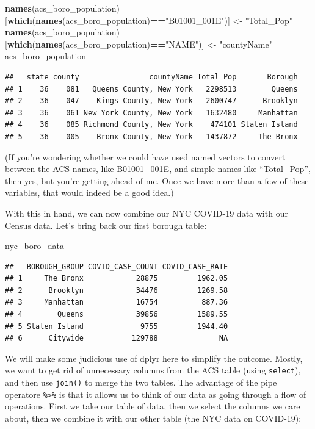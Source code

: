 \documentclass[openany]{book}
\newenvironment{Shaded}{\begin{snugshade}}{\end{snugshade}}
\newcommand{\KeywordTok}[1]{\textcolor[rgb]{0.13,0.29,0.53}{\textbf{#1}}}
\newcommand{\NormalTok}[1]{#1}
\newcommand{\OperatorTok}[1]{\textcolor[rgb]{0.81,0.36,0.00}{\textbf{#1}}}
\newcommand{\StringTok}[1]{\textcolor[rgb]{0.31,0.60,0.02}{#1}}
\begin{document}
\begin{Shaded}
\begin{Highlighting}[]
\KeywordTok{names}\NormalTok{(acs_boro_population)[}\KeywordTok{which}\NormalTok{(}\KeywordTok{names}\NormalTok{(acs_boro_population)}\OperatorTok{==}\StringTok{"B01001_001E"}\NormalTok{)] <-}\StringTok{ "Total_Pop"}
\KeywordTok{names}\NormalTok{(acs_boro_population)[}\KeywordTok{which}\NormalTok{(}\KeywordTok{names}\NormalTok{(acs_boro_population)}\OperatorTok{==}\StringTok{"NAME"}\NormalTok{)] <-}\StringTok{ "countyName"}
\NormalTok{acs_boro_population}
\end{Highlighting}
\end{Shaded}

\begin{verbatim}
##   state county                countyName Total_Pop       Borough
## 1    36    081   Queens County, New York   2298513        Queens
## 2    36    047    Kings County, New York   2600747      Brooklyn
## 3    36    061 New York County, New York   1632480     Manhattan
## 4    36    085 Richmond County, New York    474101 Staten Island
## 5    36    005    Bronx County, New York   1437872     The Bronx
\end{verbatim}

(If you're wondering whether we could have used named vectors to convert between the ACS names, like B01001\_001E, and simple names like ``Total\_Pop'', then yes, but you're getting ahead of me. Once we have more than a few of these variables, that would indeed be a good idea.)

With this in hand, we can now combine our NYC COVID-19 data with our Census data. Let's bring back our first borough table:

\begin{Shaded}
\begin{Highlighting}[]
\NormalTok{nyc_boro_data}
\end{Highlighting}
\end{Shaded}

\begin{verbatim}
##   BOROUGH_GROUP COVID_CASE_COUNT COVID_CASE_RATE
## 1     The Bronx            28875         1962.05
## 2      Brooklyn            34476         1269.58
## 3     Manhattan            16754          887.36
## 4        Queens            39856         1589.55
## 5 Staten Island             9755         1944.40
## 6      Citywide           129788              NA
\end{verbatim}

We will make some judicious use of dplyr here to simplify the outcome. Mostly, we want to get rid of unnecessary columns from the ACS table (using \texttt{select}), and then use \texttt{join()} to merge the two tables. The advantage of the pipe operatore \texttt{\%\textgreater{}\%} is that it allows us to think of our data as going through a flow of operations. First we take our table of data, then we select the columns we care about, then we combine it with our other table (the NYC data on COVID-19):
\end{document}
